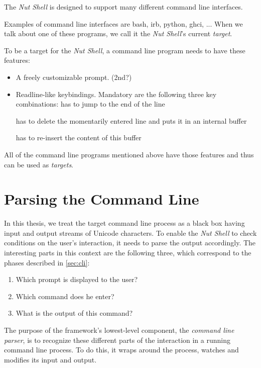 \documentclass[paper=a4,twoside,abstract=on,cleardoublepage=empty,numbers=noenddot,toc=bib,12pt]{scrreprt}
\begin{document}
The \emph{Nut Shell} is designed to support many different command line interfaces.

Examples of command line interfaces are bash, irb, python, ghci, ... When we talk about one of these programs, we call it the \emph{Nut Shell}'s current \emph{target}.

To be a target for the \emph{Nut Shell}, a command line program needs to have these features:

\begin{itemize}
    \item A freely customizable prompt. (2nd?)
    \item Readline-like keybindings. Mandatory are the following three key combinations:
         has to jump to the end of the line

         has to delete the momentarily entered line and puts it in an internal buffer
        
         has to re-insert the content of this buffer
\end{itemize}

All of the command line programs mentioned above have those features and thus can be used as \emph{targets}.

\chapter{Parsing the Command Line}

In this thesis, we treat the target command line process as a black box having input and output streams of Unicode characters. To enable the \emph{Nut Shell} to check conditions on the user's interaction, it needs to parse the output accordingly. The interesting parts in this context are the following three, which correspond to the phases described in \cref{sec:cli}:

\begin{enumerate}
    \item Which prompt is displayed to the user?
    \item Which command does he enter?
    \item What is the output of this command?
\end{enumerate}

The purpose of the framework's lowest-level component, the \emph{command line parser}, is to recognize these different parts of the interaction in a running command line process. To do this, it wraps around the process, watches and modifies its input and output.
\end{document}
